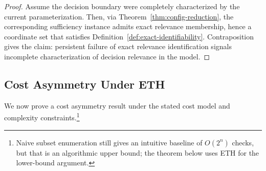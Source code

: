 \begin{proof}
Assume the decision boundary were completely characterized by the current parameterization. Then, via Theorem~\ref{thm:config-reduction}, the corresponding sufficiency instance admits exact relevance membership, hence a coordinate set that satisfies Definition~\ref{def:exact-identifiability}. Contraposition gives the claim: persistent failure of exact relevance identification signals incomplete characterization of decision relevance in the model.
\end{proof}

\subsection{Cost Asymmetry Under ETH}

We now prove a cost asymmetry result under the stated cost model and complexity constraints.\footnote{Naive subset enumeration still gives an intuitive baseline of $O(2^n)$ checks, but that is an algorithmic upper bound; the theorem below uses ETH for the lower-bound argument.}

